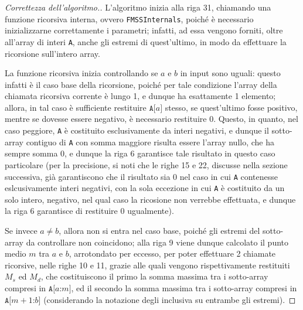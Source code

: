 \documentclass[a4paper, 12pt]{report}
\begin{document}
    \begin{proof}[Correttezza dell'algoritmo.]
        L'algoritmo inizia alla riga 31, chiamando una funzione ricorsiva interna, ovvero \texttt{FMSSInternals}, poiché è necessario inizializzarne correttamente i parametri; infatti, ad essa vengono forniti, oltre all'array di interi \texttt{A}, anche gli estremi di quest'ultimo, in modo da effettuare la ricorsione sull'intero array.

        La funzione ricorsiva inizia controllando se $a$ e $b$ in input sono uguali: questo infatti è il caso base della ricorsione, poiché per tale condizione l'array della chiamata ricorsiva corrente è lungo 1, e dunque ha esattamente 1 elemento; allora, in tal caso è sufficiente restituire $\texttt{A[}a\texttt{]}$ stesso, se quest'ultimo fosse positivo, mentre se dovesse essere negativo, è necessario restituire 0. Questo, in quanto, nel caso peggiore, \texttt{A} è costituito esclusivamente da interi negativi, e dunque il sotto-array contiguo di \texttt{A} con somma maggiore risulta essere l'array nullo, che ha sempre somma 0, e dunque la riga 6 garantisce tale risultato in questo caso particolare (per la precisione, si noti che le righe 15 e 22, discusse nella sezione successiva, già garantiscono che il risultato sia 0 nel caso in cui \texttt{A} contenesse eslcusivamente interi negativi, con la sola eccezione in cui \texttt{A} è costituito da un solo intero, negativo, nel qual caso la ricosione non verrebbe effettuata, e dunque la riga 6 garantisce di restituire 0 ugualmente).

        Se invece $a \neq b$, allora non si entra nel caso base, poiché gli estremi del sotto-array da controllare non coincidono; alla riga 9 viene dunque calcolato il punto medio $m$ tra $a$ e $b$, arrotondato per eccesso, per poter effettuare 2 chiamate ricorsive, nelle righe 10 e 11, grazie alle quali vengono rispettivamente restituiti $M_s$ ed $M_d$, che costituiscono il primo la somma massima tra i sotto-array compresi in $\texttt{A[}a\texttt{:}m\texttt{]}$, ed il secondo la somma massima tra i sotto-array compresi in $\texttt{A[}m + 1\texttt{:}b\texttt{]}$ (considerando la notazione degli  inclusiva su entrambe gli estremi).


\end{proof}
\end{document}
